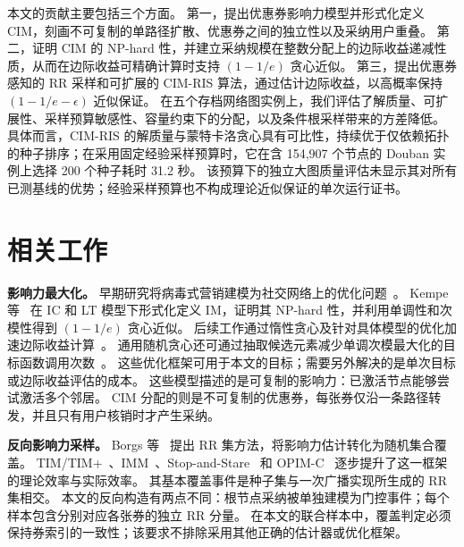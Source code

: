 \documentclass[sigconf,balance=false]{acmart}
\newcommand{\CIMRIS}{\textsc{CIM-RIS}}
\begin{document}
本文的贡献主要包括三个方面。
第一，提出优惠券影响力模型并形式化定义 CIM，刻画不可复制的单路径扩散、优惠券之间的独立性以及采纳用户重叠。
第二，证明 CIM 的 NP-hard 性，并建立采纳规模在整数分配上的边际收益递减性质，从而在边际收益可精确计算时支持 $(1-1/e)$ 贪心近似。
第三，提出优惠券感知的 RR 采样和可扩展的 \CIMRIS{} 算法，通过估计边际收益，以高概率保持 $(1-1/e-\epsilon)$ 近似保证。
在五个存档网络图实例上，我们评估了解质量、可扩展性、采样预算敏感性、容量约束下的分配，以及条件根采样带来的方差降低。
具体而言，\CIMRIS{} 的解质量与蒙特卡洛贪心具有可比性，持续优于仅依赖拓扑的种子排序；在采用固定经验采样预算时，它在含 154,907 个节点的 Douban 实例上选择 200 个种子耗时 31.2 秒。
该预算下的独立大图质量评估未显示其对所有已测基线的优势；经验采样预算也不构成理论近似保证的单次运行证书。

\section{相关工作}
\label{sec:related}

\textbf{影响力最大化。}
早期研究将病毒式营销建模为社交网络上的优化问题~\cite{domingos2001mining,richardson2002mining}。
Kempe 等~\cite{kempe2003maximizing} 在 IC 和 LT 模型下形式化定义 IM，证明其 NP-hard 性，并利用单调性和次模性得到 $(1-1/e)$ 贪心近似。
后续工作通过惰性贪心及针对具体模型的优化加速边际收益计算~\cite{leskovec2007celf,goyal2011celf,chen2009efficient}。
通用随机贪心还可通过抽取候选元素减少单调次模最大化的目标函数调用次数~\cite{mirzasoleiman2015lazier}。
这些优化框架可用于本文的目标；需要另外解决的是单次目标或边际收益评估的成本。
这些模型描述的是可复制的影响力：已激活节点能够尝试激活多个邻居。
CIM 分配的则是不可复制的优惠券，每张券仅沿一条路径转发，并且只有用户核销时才产生采纳。

\textbf{反向影响力采样。}
Borgs 等~\cite{borgs2014maximizing} 提出 RR 集方法，将影响力估计转化为随机集合覆盖。
TIM/TIM+~\cite{tang2014influence}、IMM~\cite{tang2015influence}、Stop-and-Stare~\cite{nguyen2016stop,huang2017revisiting} 和 OPIM-C~\cite{tang2018online} 逐步提升了这一框架的理论效率与实际效率。
其基本覆盖事件是种子集与一次广播实现所生成的 RR 集相交。
本文的反向构造有两点不同：根节点采纳被单独建模为门控事件；每个样本包含分别对应各张券的独立 RR 分量。
在本文的联合样本中，覆盖判定必须保持券索引的一致性；该要求不排除采用其他正确的估计器或优化框架。
\end{document}
